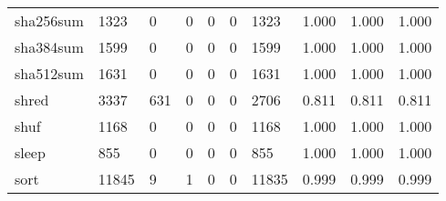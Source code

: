 \begin{longtable}{lp{2.0cm}p{2.0cm}p{2.0cm}p{2.0cm}p{2.0cm}p{2.0cm}p{2.0cm}p{2.0cm}p{2.0cm}}
sha256sum &                   1323 &                                  0 &                                 0 &                                0 &                                 0 &                            1323 &                                   1.000 &                                  1.000 &                                1.000 \\
sha384sum &                   1599 &                                  0 &                                 0 &                                0 &                                 0 &                            1599 &                                   1.000 &                                  1.000 &                                1.000 \\
sha512sum &                   1631 &                                  0 &                                 0 &                                0 &                                 0 &                            1631 &                                   1.000 &                                  1.000 &                                1.000 \\
shred     &                   3337 &                                631 &                                 0 &                                0 &                                 0 &                            2706 &                                   0.811 &                                  0.811 &                                0.811 \\
shuf      &                   1168 &                                  0 &                                 0 &                                0 &                                 0 &                            1168 &                                   1.000 &                                  1.000 &                                1.000 \\
sleep     &                    855 &                                  0 &                                 0 &                                0 &                                 0 &                             855 &                                   1.000 &                                  1.000 &                                1.000 \\
sort      &                  11845 &                                  9 &                                 1 &                                0 &                                 0 &                           11835 &                                   0.999 &                                  0.999 &                                0.999 \\

\end{longtable}
